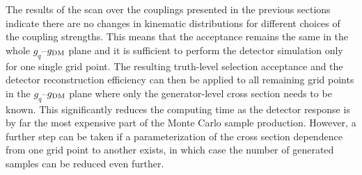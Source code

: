 The results of the scan over the couplings presented in the previous sections indicate there are no changes in kinematic distributions for different choices of the coupling strengths. This means that the acceptance remains the same in the whole $g_q$--$g_{\rm{DM}}$ plane and it is sufficient to perform the detector simulation only for one single grid point. The resulting truth-level selection acceptance and the detector reconstruction efficiency can then be applied to all remaining grid points in the $g_q$--$g_{\rm{DM}}$ plane where only the generator-level cross section needs to be known. This significantly reduces the computing time as the detector response is by far the most expensive part of the Monte Carlo sample production. However, a further step can be taken if a parameterization of the cross section dependence from one grid point to another exists, in which case the number of generated samples can be reduced even further.

